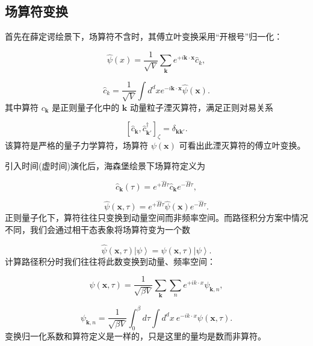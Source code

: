 \documentclass[UTF8]{ctexart}
\begin{document}
\subsection{场算符变换}

首先在薛定谔绘景下，场算符不含时，其傅立叶变换采用“开根号”归一化：

\begin{equation}
\hat{\psi}\left(x\right)=\frac{1}{\sqrt{V}}\sum_{\bm{k}}e^{+i\bm{k}\cdot\bm{x}}\hat{c}_{k},
\end{equation}

\begin{equation}
\hat{c}_{k}=\frac{1}{\sqrt{V}}\int d^{d}xe^{-i\bm{k}\cdot\bm{x}}\hat{\psi}\left(\bm{x}\right).
\end{equation}
其中算符 $c_{\bm{k}}$ 是正则量子化中的 $\bm{k}$ 动量粒子湮灭算符，满足正则对易关系

\begin{equation}
\left[\hat{c}_{\bm{k}},\hat{c}_{\bm{k}'}^{\dagger}\right]_{\zeta}=\delta_{\bm{k}\bm{k}'}.
\end{equation}
该算符是严格的量子力学算符，场算符 $\psi\left(\bm{x}\right)$ 可看出此湮灭算符的傅立叶变换。

引入时间(虚时间)演化后，海森堡绘景下场算符定义为

\begin{equation}
\hat{c}_{\bm{k}}\left(\tau\right)=e^{+\hat{H}\tau}\hat{c}_{\bm{k}}e^{-\hat{H}\tau},
\end{equation}

\begin{equation}
\hat{\psi}\left(\bm{x},\tau\right)=e^{+\hat{H}\tau}\hat{\psi}\left(\bm{x}\right)e^{-\hat{H}\tau}.
\end{equation}
正则量子化下，算符往往只变换到动量空间而非频率空间。而路径积分方案中情况不同，我们会通过相干态表象将场算符变为一个数

\begin{equation}
\hat{\psi}\left(\bm{x},\tau\right)\left|\psi\right\rangle =\psi\left(\bm{x},\tau\right)\left|\psi\right\rangle .
\end{equation}
计算路径积分时我们往往将此数变换到动量、频率空间：

\begin{equation}
\psi\left(\bm{x},\tau\right)=\frac{1}{\sqrt{\beta V}}\sum_{\bm{k}}\sum_{n}e^{+ik\cdot x}\psi_{\bm{k},n},
\end{equation}

\begin{equation}
\psi_{\bm{k},n}=\frac{1}{\sqrt{\beta V}}\int_{0}^{\beta}d\tau\int d^{d}x\ e^{-ik\cdot x}\psi\left(\bm{x},\tau\right).
\end{equation}
变换归一化系数和算符定义是一样的，只是这里的量均是数而非算符。
\end{document}
